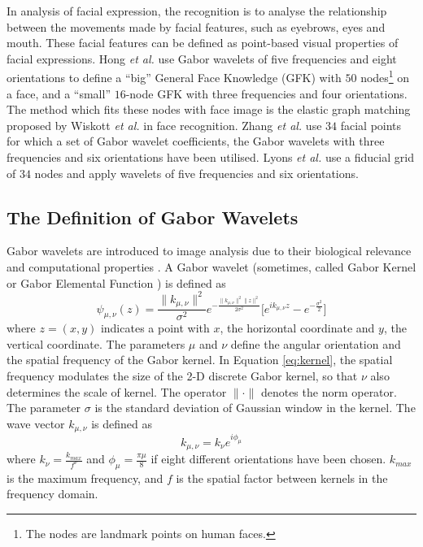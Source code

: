 In analysis of facial expression, the recognition is to analyse the relationship between the movements made by facial features, such as eyebrows, eyes and mouth. These facial features can be defined as point-based visual properties of facial expressions. Hong \textit{et al.} \cite{Hong1998} use Gabor wavelets of five frequencies and eight orientations to define a ``big'' General Face Knowledge (GFK) with $50$ nodes\footnote{The nodes are landmark points on human faces.} on a face, and a ``small'' $16$-node GFK with three frequencies and four orientations. The method which fits these nodes with face image is the elastic graph matching proposed by Wiskott \textit{et al.} \cite{Wiskott1997,Wiskott1999} in face recognition. Zhang \textit{et al.} \cite{Zhang1998} use $34$ facial points for which a set of Gabor wavelet coefficients, the Gabor wavelets with three frequencies and six orientations have been utilised. Lyons \textit{et al.} \cite{Lyons1999} use a fiducial grid of $34$ nodes and apply wavelets of five frequencies and six orientations.


\subsection{The Definition of Gabor Wavelets}
\label{sec:definGabor}
Gabor wavelets are introduced to image analysis due to their biological relevance and computational properties \cite{Jones1987}. A Gabor wavelet \cite{Daugman1988} (sometimes, called Gabor Kernel or Gabor Elemental Function \cite{Dunn1994}) is defined as 
\begin{equation}\label{eq:kernel}
\psi_{\mu,\nu}(z)=\frac{\|{k_{\mu,\nu}}\| ^ {2}}{\sigma ^{2}}e^{-\frac{\|{k_{\mu,\nu}}\|^ {2}\|z\|^{2}}{2\sigma ^{2}}}\lbrack{e^{ik_{\mu,\nu} z}-e^{-\frac{\sigma^2}{2}}}\rbrack
\end{equation}
where $z=(x,y)$ indicates a point with $x$, the horizontal coordinate and $y$, the vertical coordinate. The parameters $\mu$ and $\nu$ define the angular orientation and the spatial frequency of the Gabor kernel. In \mbox{Equation} \ref{eq:kernel}, the spatial frequency modulates the size of the 2-D discrete Gabor kernel, so that $\nu$ also determines the scale of kernel. The operator $\|\cdot\|$ denotes the norm operator. The parameter $\sigma$ is the standard deviation of Gaussian window in the kernel. The wave vector $k_{\mu,\nu}$ is defined as
\begin{equation}\label{eq:wavevector}
k_{\mu,\nu}=k_{\nu}e^{i\phi_{\mu}}
\end{equation}
where $k_{\nu}=\frac{k_{max}}{f^{\nu}}$ and $\phi_{\mu}=\frac{\pi\mu}{8}$ if eight different orientations have been chosen. $k_{max}$ is the maximum frequency, and $f$ is the spatial factor between
kernels in the frequency domain.
